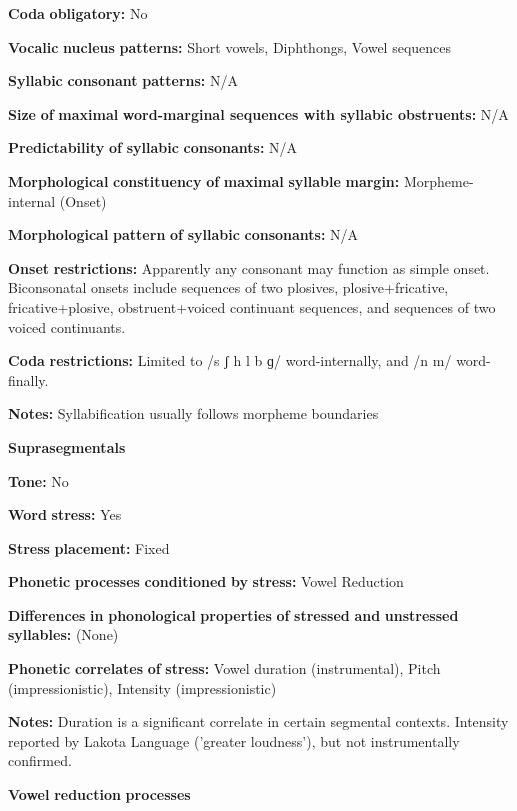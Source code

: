 \begin{styleBody}
\textbf{Coda} \textbf{obligatory:} No

\textbf{Vocalic} \textbf{nucleus} \textbf{patterns:} Short vowels, Diphthongs, Vowel sequences

\textbf{Syllabic} \textbf{consonant} \textbf{patterns:} N/A

\textbf{Size} \textbf{of} \textbf{maximal} \textbf{word{}-marginal sequences with syllabic obstruents:} N/A

\textbf{Predictability} \textbf{of} \textbf{syllabic} \textbf{consonants:} N/A

\textbf{Morphological} \textbf{constituency} \textbf{of} \textbf{maximal} \textbf{syllable} \textbf{margin:} Morpheme-internal (Onset)

\textbf{Morphological} \textbf{pattern} \textbf{of} \textbf{syllabic} \textbf{consonants:} N/A

\textbf{Onset} \textbf{restrictions:} Apparently any consonant may function as simple onset. Biconsonatal onsets include sequences of two plosives, plosive+fricative, fricative+plosive, obstruent+voiced continuant sequences, and sequences of two voiced continuants.

\textbf{Coda} \textbf{restrictions:} Limited to /s ʃ h l b ɡ/ word-internally, and /n m/ word-finally.

\textbf{Notes:} Syllabification usually follows morpheme boundaries

\textbf{Suprasegmentals}

\textbf{Tone:} No

\textbf{Word} \textbf{stress:} Yes

\textbf{Stress} \textbf{placement:} Fixed

\textbf{Phonetic} \textbf{processes} \textbf{conditioned} \textbf{by} \textbf{stress:} Vowel Reduction

\textbf{Differences} \textbf{in} \textbf{phonological} \textbf{properties} \textbf{of} \textbf{stressed} \textbf{and} \textbf{unstressed} \textbf{syllables:} (None)

\textbf{Phonetic} \textbf{correlates} \textbf{of} \textbf{stress:} Vowel duration (instrumental), Pitch (impressionistic), Intensity (impressionistic)

\textbf{Notes:} Duration is a significant correlate in certain segmental contexts. Intensity reported by Lakota Language \citet{Consortium2008} (’greater loudness’), but not instrumentally confirmed.

\textbf{Vowel} \textbf{reduction} \textbf{processes}


\end{styleBody}
